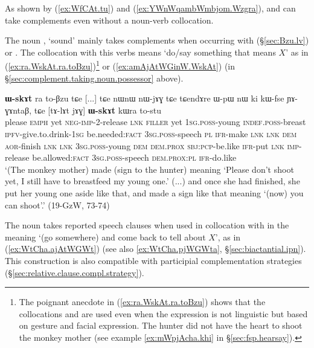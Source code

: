As shown by (\ref{ex:WfCAt.tu}) and (\ref{ex:YWnWqambWmbjom.Wzgra}),  and  can take complements even without a noun-verb collocation. 

The noun , `sound' mainly takes complements when occurring with  (§\ref{sec:Bzu.lv}) or . The collocation with this verbs means `do/say something that means $X$' as in (\ref{ex:ra.WskAt.ra.toBzu})\footnote{The poignant anecdote in (\ref{ex:ra.WskAt.ra.toBzu}) shows that the collocations  and  are used even when the expression is not linguistic but based on gesture and facial expression. The hunter did not have the heart to shoot the monkey mother (see example \ref{ex:mWpjAcha.khi} in §\ref{sec:fsp.hearsay}). } or (\ref{ex:amAjAtWGinW.WskAt}) (in §\ref{sec:complement.taking.noun.possessor} above).

\begin{exe}
   \ex  \label{ex:ra.WskAt.ra.toBzu}
 \textbf{ɯ-skɤt} ra to-βzu tɕe [...] tɕe nɯnɯ nɯ-jɤɣ tɕe tɕendɤre ɯ-pɯ nɯ ki kɯ-fse ɲɤ-ɣɤntaβ,
tɕe [tɤ-lɤt jɤɣ] \textbf{ɯ-skɤt} kɯra to-stu \\
please \textsc{emph} yet \textsc{neg}-\textsc{imp}-2-release \textsc{lnk} \textsc{filler} yet \textsc{1sg}.\textsc{poss}-young \textsc{indef}.\textsc{poss}-breast \textsc{ipfv}-give.to.drink-\textsc{1sg} be.needed:\textsc{fact} \textsc{3sg}.\textsc{poss}-speech \textsc{pl} \textsc{ifr}-make \textsc{lnk} {  } \textsc{lnk} \textsc{dem} \textsc{aor}-finish \textsc{lnk} \textsc{lnk} \textsc{3sg}.\textsc{poss}-young \textsc{dem} \textsc{dem}.\textsc{prox} \textsc{sbj}:\textsc{pcp}-be.like \textsc{ifr}-put \textsc{lnk} \textsc{imp}-release be.allowed:\textsc{fact} \textsc{3sg}.\textsc{poss}-speech \textsc{dem}.\textsc{prox}:\textsc{pl} \textsc{ifr}-do.like \\
\glt `(The monkey mother) made (sign to the hunter) meaning `Please don't shoot yet, I still have to breastfeed my young one.' (...) and once she had finished, she put her young one aside like that, and made a sign like that meaning `(now) you can shoot'.' (19-GzW, 73-74)
\end{exe}

The noun  takes reported speech clauses when used in collocation with  in the meaning `(go somewhere) and come back to tell about $X$', as in (\ref{ex:WtCha.ajAtWGWt}) (see also \ref{ex:WtCha.pjWGWta}, §\ref{sec:biactantial.ipn}). This construction is also compatible with participial complementation strategies  (§\ref{sec:relative.clause.compl.strategy}).


